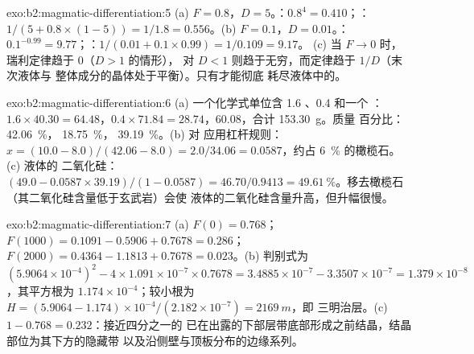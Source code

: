 \begin{solution}{exo:b2:magmatic-differentiation:5}
(a) $F = 0.8$，$D = 5$。：$0.8^{4} = 0.410$；：
$1/(5 + 0.8\times(1 - 5)) = 1/1.8 = 0.556$。(b) $F = 0.1$，$D = 0.01$。：
$0.1^{-0.99} = 9.77$；：$1/(0.01 + 0.1\times0.99) = 1/0.109 = 9.17$。
(c) 当 $F \to 0$ 时，瑞利定律趋于 $0$（$D > 1$ 的情形），
对 $D < 1$ 则趋于无穷，而定律趋于 $1/D$（末次液体与
整体成分的晶体处于平衡）。只有才能彻底
耗尽液体中的。
\end{solution}

\begin{solution}{exo:b2:magmatic-differentiation:6}
(a) 一个化学式单位含 1.6 、0.4  和一个 ：$1.6\times
40.30 = 64.48$，$0.4\times71.84 = 28.74$，60.08，合计 \qty{153.30}{g}。质量
百分比： \qty{42.06}{\percent}， \qty{18.75}{\percent}，
 \qty{39.19}{\percent}。(b) 对  应用杠杆规则：$x = (10.0 - 8.0)/(42.06
- 8.0) = 2.0/34.06 = 0.0587$，约占 \qty{6}{\percent} 的橄榄石。(c) 液体的
二氧化硅：$(49.0 - 0.0587\times39.19)/(1 - 0.0587) = 46.70/0.9413 =
\qty{49.61}{\percent}$。移去橄榄石（其二氧化硅含量低于玄武岩）会使
液体的二氧化硅含量升高，但升幅很慢。
\end{solution}

\begin{solution}{exo:b2:magmatic-differentiation:7}
(a) $F(0) = 0.768$；$F(1000) = 0.1091 - 0.5906 + 0.7678 = 0.286$；$F(2000) = 0.4364
- 1.1813 + 0.7678 = 0.023$。(b) 判别式为 $(5.9064\times10^{-4})^2 -
4\times1.091\times10^{-7}\times0.7678 = 3.4885\times10^{-7} - 3.3507\times10^{-7} =
1.379\times10^{-8}$，其平方根为 $1.174\times10^{-4}$；较小根为
$H = (5.9064 - 1.174)\times10^{-4}/(2.182\times10^{-7}) = \qty{2169}{m}$，即
三明治层。(c) $1 - 0.768 = 0.232$：接近四分之一的
已在出露的下部层带底部形成之前结晶，结晶部位为其下方的隐藏带
以及沿侧壁与顶板分布的边缘系列。
\end{solution}

